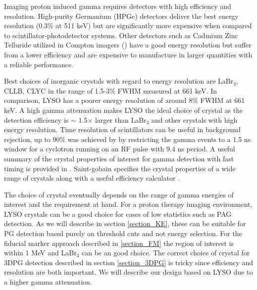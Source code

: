 \documentclass[11pt,a4paper]{article}
\begin{document}
Imaging proton induced gamma requires detectors with high efficiency and resolution. High-purity Germanium (HPGe)  detectors deliver the best energy resolution (0.3\% at 511 keV) but are significantly more expensive when compared to scintillator-photodetector systems. Other detectors such as Cadmium Zinc Telluride utilized in Compton imagers (\cite{Draeger2018}) have a good energy resolution but suffer from a lower efficiency and are expensive to manufacture in larger quantities with a reliable performance. 


Best choices  of inorganic crystals with regard to energy resolution are LaBr$_3$, CLLB, CLYC in the range of 1.5-3\% FWHM measured at 661 keV. In comparison,  LYSO has a poorer energy resolution of around 8\% FWHM at 661 keV. A high gamma attenuation makes LYSO the ideal choice of crystal as the detection efficiency is $\sim$ 1.5$\mathrm{\times}$ larger than LaBr$_3$ and other crystals with high energy resolution. Time resolution of scintillators can be useful in background rejection, up to 90\% was achieved by \cite{Verburg2013} by restricting the gamma events to a 1.5 ns window for a cyclotron running on an RF pulse with 9.4 ns period. A useful summary of the crystal properties of interest for gamma detection with fast timing is provided in \cite{Schaart2021} . Saint-gobain \cite{SaintGobain} specifies the crystal properties of a wide range of crystals along with a useful efficiency calculator \cite{SaintGobainEfficiencyCalculator}.

The choice of crystal eventually depends on the range of gamma energies of interest and the requirement at hand. For a proton therapy imaging environment, LYSO crystals can be a good choice for cases of low statistics such as PAG detection. As we will describe in  section \ref{section_KE}, these can be suitable for PG detection based purely on threshold cuts and not energy selection. For the fiducial marker approach  described in \ref{section_FM} the region of interest is within 1 MeV and LaBr$_3$ can be an good choice. The correct choice of crystal for 3DPG detection described in section \ref{section_3DPG} is tricky since efficiency and resolution are both important. We will describe our design based on LYSO due to a higher gamma attenuation.
\end{document}

